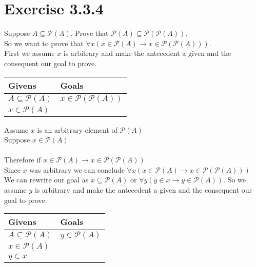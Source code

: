 \documentclass{article}
\newcommand{\n}{ \noindent }
\newcommand{\pwset}{\mathscr{P}}
\begin{document}
\section*{Exercise 3.3.4}
\n Suppose $A \subseteq \pwset(A)$. Prove that $\pwset(A) \subseteq \pwset(\pwset(A))$. \\


\n So we want to prove that
$\forall x(x \in \pwset(A) \rightarrow x \in \pwset(\pwset(A)))$.\\

\n First we assume $x$ is arbitrary and make the antecedent a given and the consequent our goal to prove. \\

\begin{table}[h]
\begin{tabular}{ll}
\hline
Givens & Goals   \\ \hline
$A \subseteq \pwset(A)$ & $x \in \pwset(\pwset(A))$  \\ 
$x \in \pwset(A)$ & \\ \hline
\end{tabular}
\end{table}

\n Assume $x$ is an arbitrary element of $\pwset(A)$ \\
\indent Suppose $x \in \pwset(A)$ \\
\indent \indent [ proof of $x \in \pwset(\pwset(A))$ ] \\
\indent Therefore if $x \in \pwset(A) \rightarrow x \in \pwset(\pwset(A))$ \\
\n Since $x$ was arbitrary we can conclude $\forall x(x \in \pwset(A) \rightarrow x \in \pwset(\pwset(A)))$ \\

\n We can rewrite our goal as $x \subseteq \pwset(A)$ or $\forall y(y \in x \rightarrow y \in \pwset(A))$. So we assume $y$ is arbitrary and make the antecedent a given and the consequent our goal to prove.

\begin{table}[h]
\begin{tabular}{ll}
\hline
Givens & Goals   \\ \hline
$A \subseteq \pwset(A)$ & $y \in \pwset(A)$  \\ 
$x \in \pwset(A)$ & \\ 
$y \in x$ & \\ \hline
\end{tabular}
\end{table}
\end{document}
